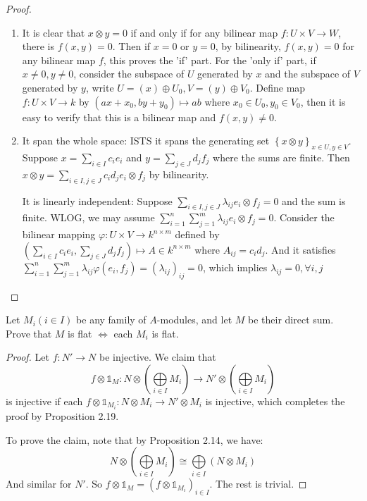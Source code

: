 \documentclass{solution}
\begin{document}
\begin{proof}
    \begin{enumerate}
        \item It is clear that $x \otimes y = 0$ if and only if for any bilinear map $f: U \times V \rightarrow W$, there is $f(x, y) = 0$. Then if $x = 0$ or $y = 0$, by bilinearity, $f(x, y) = 0$ for any bilinear map $f$, this proves the 'if' part. For the 'only if' part, if $x \ne 0, y \ne 0$, consider the subspace of $U$ generated by $x$ and the subspace of $V$ generated by $y$, write $U = (x) \oplus U_0, V = (y) \oplus V_0$. Define map $f: U \times V \rightarrow k$ by $(ax + x_0, by + y_0) \mapsto ab$ where $x_0 \in U_0, y_0 \in V_0$, then it is easy to verify that this is a bilinear map and $f(x, y) \ne 0$.
        \item It span the whole space: ISTS it spans the generating set $\left\lbrace x \otimes y \right\rbrace_{x \in U, y \in V}$. Suppose $x = \sum\limits_{i \in I} c_i e_i$ and $y = \sum\limits_{j \in J} d_j f_j$ where the sums are finite. Then $x \otimes y = \sum\limits_{i \in I, j \in J} c_id_j e_i \otimes f_j$ by bilinearity.

        It is linearly independent: Suppose $\sum\limits_{i \in I, j \in J} \lambda_{ij} e_i \otimes f_j = 0$ and the sum is finite. WLOG, we may assume $\sum\limits_{i = 1}^{n} \sum\limits_{j = 1}^{m} \lambda_{ij} e_i \otimes f_j = 0$. Consider the bilinear mapping $\varphi: U \times V \rightarrow k^{n \times m}$ defined by $\left(\sum\limits_{i \in I} c_i e_i, \sum\limits_{j \in J} d_j f_j\right) \mapsto A \in k^{n \times m}$ where $A_{ij} = c_id_j$. And it satisfies $\sum\limits_{i = 1}^{n} \sum\limits_{j = 1}^{m} \lambda_{ij} \varphi(e_i, f_j) = (\lambda_{ij})_{ij} = 0$, which implies $\lambda_{ij} = 0, \forall i, j$
    \end{enumerate}
\end{proof}

\begin{problem}
    Let $M_i(i \in I)$ be any family of $A$-modules, and let $M$ be their direct sum. Prove that $M$ is flat $\Leftrightarrow$ each $M_i$ is flat.
\end{problem}

\begin{proof}
    Let $f: N' \rightarrow N$ be injective. We claim that
    $$f \otimes \mathds{1}_M: N \otimes (\bigoplus\limits_{i \in I} M_i) \rightarrow N' \otimes (\bigoplus\limits_{i \in I} M_i)$$
    is injective if each $f \otimes \mathds{1}_{M_i}: N \otimes M_i \rightarrow N' \otimes M_i$ is injective, which completes the proof by Proposition 2.19.

    To prove the claim, note that by Proposition 2.14, we have:
    $$N \otimes (\bigoplus\limits_{i \in I} M_i) \cong \bigoplus\limits_{i \in I} (N \otimes M_i)$$
    And similar for $N'$. So $f \otimes \mathds{1}_M = (f \otimes \mathds{1}_{M_i})_{i \in I}$. The rest is trivial.
\end{proof}
\end{document}
